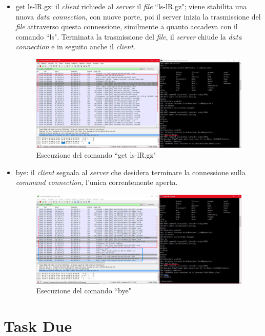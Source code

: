 \documentclass[a4paper, 12pt]{report}
\begin{document}
\begin{itemize}
    \item get ls-lR.gz: il \textit{client} richiede al \textit{server} il \textit{file} ``ls-lR.gz"; viene stabilita una nuova \textit{data connection}, con nuove porte, poi il server inizia la trasmissione
    del \textit{file} attraverso questa connessione, similmente a quanto accadeva con il comando ``ls". Terminata la trasmissione del \textit{file}, il \textit{server} chiude la \textit{data connection} e in seguito anche il \textit{client}.

    \begin{figure}[H]
        \centering
        \includegraphics[width=\linewidth]{images/image1_5.png}
        \caption{Esecuzione del comando ``get ls-lR.gz"}
    \end{figure}

    \item bye: il \textit{client} segnala al \textit{server} che desidera terminare la connessione sulla \textit{command connection}, l’unica correntemente aperta.
    
    \begin{figure}[H]
        \centering
        \includegraphics[width=\linewidth]{images/image1_6.png}
        \caption{Esecuzione del comando ``bye"}
    \end{figure}
\end{itemize}

\chapter{Task Due}
\end{document}
